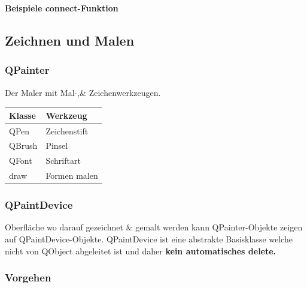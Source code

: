 \vspace{0.5pt}
\textbf{Beispiele connect-Funktion}


\subsection{Zeichnen und Malen}
\begin{multicols}{2}
	\subsubsection{QPainter}
	Der Maler mit Mal-,\& Zeichenwerkzeugen.\\
	
	\begin{tabular}{|l|l|}
		\hline \textbf{Klasse} & \textbf{Werkzeug}\\
		\hline QPen & Zeichenstift\\
		\hline QBrush & Pinsel\\
		\hline QFont & Schriftart\\
		\hline draw & Formen malen\\
		\hline
	\end{tabular}
	
	\subsubsection{QPaintDevice}
	Oberfläche wo darauf gezeichnet \& gemalt werden kann
	QPainter-Objekte zeigen auf QPaintDevice-Objekte. QPaintDevice ist eine abstrakte Basisklasse welche nicht von QObject abgeleitet ist und daher \textbf{kein automatisches delete.}\\

\end{multicols}

\subsubsection{Vorgehen}
